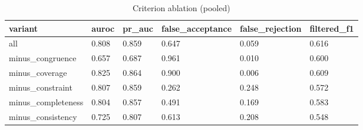 \begin{table}[t]
\centering
\small
\begin{tabular}{llllll}
\hline
variant & auroc & pr\_auc & false\_acceptance & false\_rejection & filtered\_f1 \\
\hline
all & 0.808 & 0.859 & 0.647 & 0.059 & 0.616 \\
minus\_congruence & 0.657 & 0.687 & 0.961 & 0.010 & 0.600 \\
minus\_coverage & 0.825 & 0.864 & 0.900 & 0.006 & 0.609 \\
minus\_constraint & 0.807 & 0.859 & 0.262 & 0.248 & 0.572 \\
minus\_completeness & 0.804 & 0.857 & 0.491 & 0.169 & 0.583 \\
minus\_consistency & 0.725 & 0.807 & 0.613 & 0.208 & 0.548 \\
\hline
\end{tabular}
\caption{Criterion ablation (pooled)}
\label{tab:ablation_pooled}
\end{table}
